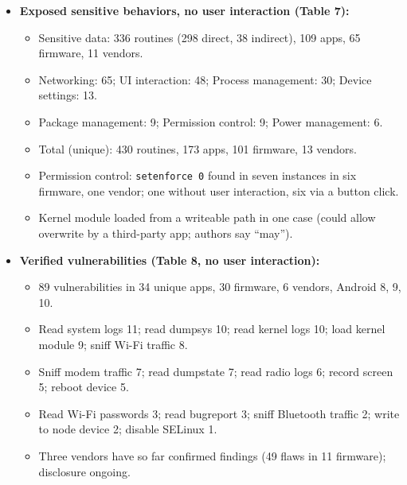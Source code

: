 \documentclass[11pt,a4paper]{article}
\begin{document}
\begin{enumerate}
\begin{itemize}[leftmargin=*, itemsep=1pt, topsep=2pt]
\begin{itemize}[itemsep=0pt]
            \item 2,685 unique custom scripts, 310 known scripts, 16,772 custom binaries, 18,419 known binaries used by Init routines.
            \item Exposed routines called 1,161 custom scripts, 414 custom binaries, 181 known binaries.
            \item 581 custom scripts and 410 custom binaries invoke a sensitive command.
        \end{itemize}
        \item \textbf{Exposed sensitive behaviors, no user interaction (Table 7):}
        \begin{itemize}[itemsep=0pt]
            \item Sensitive data: 336 routines (298 direct, 38 indirect), 109 apps, 65 firmware, 11 vendors.
            \item Networking: 65; UI interaction: 48; Process management: 30; Device settings: 13.
            \item Package management: 9; Permission control: 9; Power management: 6.
            \item Total (unique): 430 routines, 173 apps, 101 firmware, 13 vendors.
            \item Permission control: \texttt{setenforce 0} found in seven instances in six firmware, one vendor; one without user interaction, six via a button click.
            \item Kernel module loaded from a writeable path in one case (could allow overwrite by a third-party app; authors say ``may'').
        \end{itemize}
        \item \textbf{Verified vulnerabilities (Table 8, no user interaction):}
        \begin{itemize}[itemsep=0pt]
            \item 89 vulnerabilities in 34 unique apps, 30 firmware, 6 vendors, Android 8, 9, 10.
            \item Read system logs 11; read dumpsys 10; read kernel logs 10; load kernel module 9; sniff Wi-Fi traffic 8.
            \item Sniff modem traffic 7; read dumpstate 7; read radio logs 6; record screen 5; reboot device 5.
            \item Read Wi-Fi passwords 3; read bugreport 3; sniff Bluetooth traffic 2; write to node device 2; disable SELinux 1.
            \item Three vendors have so far confirmed findings (49 flaws in 11 firmware); disclosure ongoing.

\end{itemize}
\end{itemize}
\end{enumerate}
\end{document}
